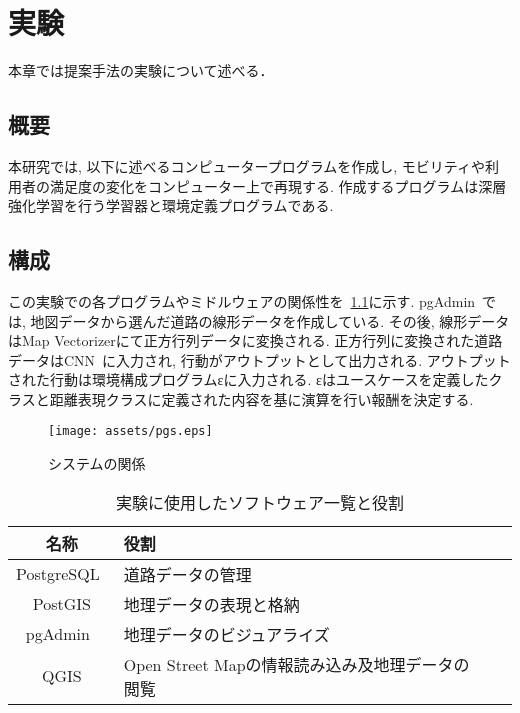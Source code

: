 \chapter{実験}
\label{implementation}

本章では提案手法の実験について述べる．

\section{概要}

本研究では, 以下に述べるコンピュータープログラムを作成し, モビリティや利用者の満足度の変化をコンピューター上で再現する.
作成するプログラムは深層強化学習を行う学習器と環境定義プログラムである.

\section{構成}

この実験での各プログラムやミドルウェアの関係性を~\ref{system_overview}に示す.
pgAdmin~\cite{pgadmin}では, 地図データから選んだ道路の線形データを作成している. その後, 線形データはMap Vectorizerにて正方行列データに変換される.
正方行列に変換された道路データはCNN~\cite{CNN}に入力され, 行動がアウトプットとして出力される. アウトプットされた行動は環境構成プログラムεに入力される.
εはユースケースを定義したクラスと距離表現クラスに定義された内容を基に演算を行い報酬を決定する.

\begin{figure}[H]
  \centering  %
  \texttt{[image: assets/pgs.eps]}
  \caption{システムの関係}  \label{system_overview}
\end{figure}




\begin{table}[h]
  \caption{実験に使用したソフトウェア一覧と役割}
  \label{table:SpeedOfLight}
  \centering
  \begin{tabular}{clll}
    \hline
      名称 & 役割 \\
      \hline \hline
      PostgreSQL~\cite{pgsql} & 道路データの管理 \\
      PostGIS & 地理データの表現と格納 \\
      pgAdmin~\cite{pgadmin} & 地理データのビジュアライズ \\
      QGIS & Open Street Mapの情報読み込み及地理データの閲覧 \\
    \hline
  \end{tabular}
\end{table}


